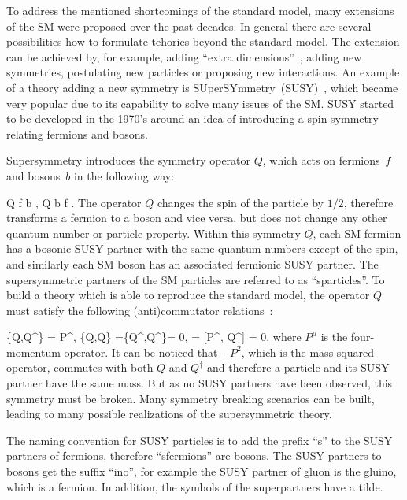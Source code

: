 To address the mentioned shortcomings of the standard model, many extensions of the SM were proposed over the past decades. In general there are several possibilities how to formulate tehories beyond the standard model. The extension can be achieved by, for example, adding ``extra dimensions''~\cite{Patrignani:2016xqp}, adding new symmetries, postulating new particles or proposing new interactions. An example of a theory adding a new symmetry is SUperSYmmetry~(SUSY)~\cite{Martin:1997ns}, which became very popular due to its capability to solve many issues of the SM. SUSY started to be developed in the 1970's around an idea of introducing a spin symmetry relating fermions and bosons.
  

Supersymmetry introduces the symmetry operator $Q$, which acts on fermions~$f$ and bosons~$b$ in the following way:

{
Q \mid f \rangle \to \mid b \rangle ,
}
{ 
Q \mid b \rangle \to \mid f \rangle .
}
The operator $Q$ changes the spin of the particle by $1/2$, therefore transforms a fermion to a boson and vice versa, but does not change any other quantum number or particle property. Within this symmetry $Q$, each SM fermion has a bosonic SUSY partner with the same quantum numbers except of the spin, and similarly each SM boson has an associated fermionic SUSY partner. The supersymmetric partners of the SM particles are referred to as ``sparticles''. To build a theory which is able to reproduce the standard model, the operator $Q$ must satisfy the following (anti)commutator relations~\cite{Haag:1974qh, Coleman:1967ad}:

{
\{Q,Q^{\dagger}\} = P^{\mu}, \; \{Q,Q\} =\{Q^{\dagger},Q^{\dagger}\}= 0, \; [P^{\mu}, Q] = [P^{\mu}, Q^{\dagger}] = 0,
}
where $P^{\mu}$ is the four-momentum operator. It can be noticed that $-P^{2}$, which is the mass-squared operator, commutes with both $Q$ and $Q^{\dagger}$ and therefore a particle and its SUSY partner have the same mass. But as no SUSY partners have been observed, this symmetry must be broken. Many symmetry breaking scenarios can be built, leading to many possible realizations of the supersymmetric theory. 

The naming convention for SUSY particles is to add the prefix ``s'' to the SUSY partners of fermions, therefore ``sfermions'' are bosons. The SUSY partners to bosons get the suffix ``ino'', for example the SUSY partner of gluon is the gluino, which is a fermion. In addition, the symbols of the superpartners have a tilde.

